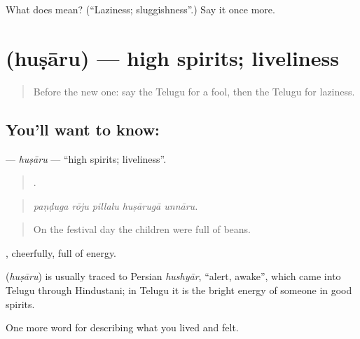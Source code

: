 \begin{tcolorbox}[breakable,colback=teal!4,colframe=teal!35!black,title={Before you move on}]
What does  mean? (\textquotedblleft{}Laziness; sluggishness\textquotedblright{}.) Say it once more.
\end{tcolorbox}
\section[\texorpdfstring{\te{హుషారు} (huṣāru)}{హుషారు (huṣāru)}]{ (huṣāru) — high spirits; liveliness}

\label{lesson:TE-C509-husaru}



\begin{quote}
Before the new one: say the Telugu for a fool, then the Telugu for laziness.
\end{quote}

\subsection*{You'll want to know: }
\textbf{} — \emph{huṣāru} — \textquotedblleft{}high spirits; liveliness\textquotedblright{}.

\begin{quote}
    .
\end{quote}

\begin{quote}
\emph{paṇḍuga rōju pillalu huṣārugā unnāru.}
\end{quote}

\begin{quote}
On the festival day the children were full of beans.
\end{quote}

, cheerfully, full of energy.

\begin{cousinweb}
\textbf{} (\emph{huṣāru}) is usually traced to Persian \emph{hushyār}, \textquotedblleft{}alert, awake\textquotedblright{}, which came into Telugu through Hindustani; in Telugu it is the bright energy of someone in good spirits.
\end{cousinweb}

\begin{grammarlens}[title={What you've built}]
One more word for describing what you lived and felt.
\end{grammarlens}


